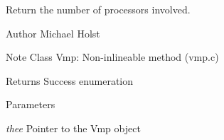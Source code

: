 Return the number of processors involved. 

\begin{DoxyAuthor}{Author}
Michael Holst 
\end{DoxyAuthor}
\begin{DoxyNote}{Note}
Class Vmp: Non-\/inlineable method (vmp.c) 
\end{DoxyNote}
\begin{DoxyReturn}{Returns}
Success enumeration 
\end{DoxyReturn}

\begin{DoxyParams}{Parameters}
\item[{\em thee}]Pointer to the Vmp object \end{DoxyParams}
